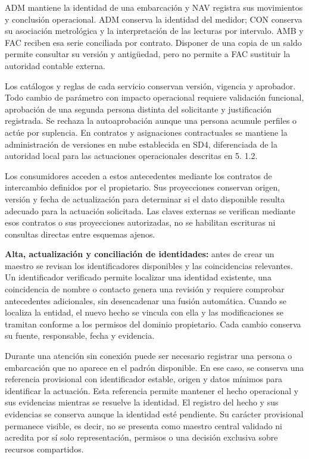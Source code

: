 ADM mantiene la identidad de una embarcación y NAV registra sus movimientos y conclusión operacional. ADM conserva la identidad del medidor; CON conserva su asociación metrológica y la interpretación de las lecturas por intervalo. AMB y FAC reciben esa serie conciliada por contrato. Disponer de una copia de un saldo permite consultar su versión y antigüedad, pero no permite a FAC sustituir la autoridad contable externa.

Los catálogos y reglas de cada servicio conservan versión, vigencia y aprobador. Todo cambio de parámetro con impacto operacional requiere validación funcional, aprobación de una segunda persona distinta del solicitante y justificación registrada. Se rechaza la autoaprobación aunque una persona acumule perfiles o actúe por suplencia. En contratos y asignaciones contractuales se mantiene la administración de versiones en nube establecida en SD4, diferenciada de la autoridad local para las actuaciones operacionales descritas en 5. 1.2.

Los consumidores acceden a estos antecedentes mediante los contratos de intercambio definidos por el propietario. Sus proyecciones conservan origen, versión y fecha de actualización para determinar si el dato disponible resulta adecuado para la actuación solicitada. Las claves externas se verifican mediante esos contratos o sus proyecciones autorizadas, no se habilitan escrituras ni consultas directas entre esquemas ajenos.

\textbf{Alta, actualización y conciliación de identidades:} antes de crear un maestro se revisan los identificadores disponibles y las coincidencias relevantes. Un identificador verificado permite localizar una identidad existente, una coincidencia de nombre o contacto genera una revisión y requiere comprobar antecedentes adicionales, sin desencadenar una fusión automática. Cuando se localiza la entidad, el nuevo hecho se vincula con ella y las modificaciones se tramitan conforme a los permisos del dominio propietario. Cada cambio conserva su fuente, responsable, fecha y evidencia.

Durante una atención sin conexión puede ser necesario registrar una persona o embarcación que no aparece en el padrón disponible. En ese caso, se conserva una referencia provisional con identificador estable, origen y datos mínimos para identificar la actuación. Esta referencia permite mantener el hecho operacional y sus evidencias mientras se resuelve la identidad. El registro del hecho y sus evidencias se conserva aunque la identidad esté pendiente. Su carácter provisional permanece visible, es decir, no se presenta como maestro central validado ni acredita por sí solo representación, permisos o una decisión exclusiva sobre recursos compartidos.

